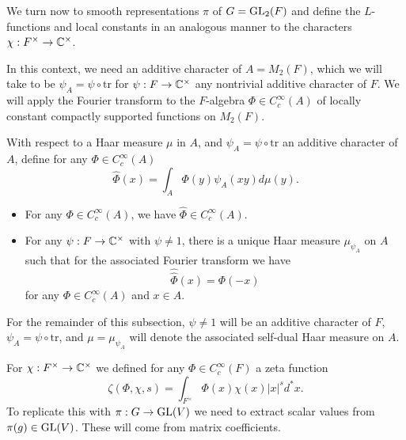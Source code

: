 We turn now to smooth representations $\pi$ of $G=\mathrm{GL}_2(F)$ and define the $L$-functions and local constants in an analogous manner to the characters $\chi :F^\times \to \mathbb{C}^\times$.

In this context, we need an additive character of $A=M_2(F)$, which we will take to be $\psi_A = \psi \circ \mathrm{tr}$ for $\psi : F \to \mathbb{C}^\times$ any nontrivial additive character of $F$. We will apply the Fourier transform to the $F$-algebra $\Phi \in C_c^\infty(A)$ of locally constant compactly supported functions on $M_2(F)$.

\begin{defn}
    With respect to a Haar measure $\mu$ in $A$, and $\psi_A=\psi \circ \mathrm{tr}$ an additive character of $A$, define for any $\Phi \in C_c^\infty(A)$
    $$\hat{\Phi}(x) = \int_A\Phi(y) \psi_A(xy)d\mu(y).$$
\end{defn}

\begin{prop}
    
    \begin{itemize}
        \item For any $\Phi \in C_c^\infty(A)$, we have $\hat{\Phi} \in C_c^\infty(A)$.
        \item For any $\psi: F \to \mathbb{C}^\times$ with $\psi \neq 1$, there is a unique Haar measure $\mu_{\psi_A}$ on $A$ such that for the associated Fourier transform we have $$\hat{\hat{\Phi}}(x) = \Phi(-x)$$ for any $\Phi \in C_c^\infty(A)$ and $x \in A$.
    \end{itemize}
    
\end{prop}

\begin{notn}
    For the remainder of this subsection, $\psi \neq 1$ will be an additive character of $F$, $\psi_A = \psi \circ \mathrm{tr}$, and $\mu= \mu_{\psi_A}$ will denote the associated self-dual Haar measure on $A$.
\end{notn}

For $\chi:F^\times \to \mathbb{C}^\times$ we defined for any $\Phi \in C_c^\infty(F)$ a zeta function $$\zeta(\Phi,\chi,s) = \int_{F^\times} \Phi(x)\chi(x) |x|^s d^*x.$$
To replicate this with $\pi : G \to \mathrm{GL}(V)$ we need to extract scalar values from $\pi(g) \in \mathrm{GL}(V)$. These will come from matrix coefficients.

